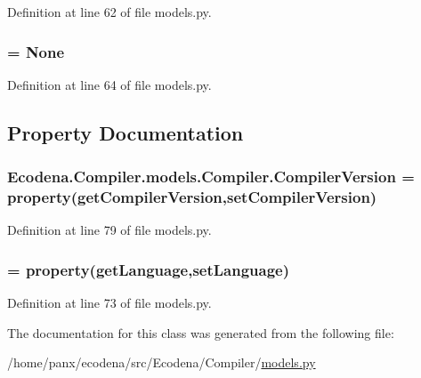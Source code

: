 Definition at line 62 of file models.py.

\hypertarget{class_ecodena_1_1_compiler_1_1models_1_1_compiler_ae14bb831a09036b817bcd4130c2d5374}{
\subsubsection[{question}]{ = None}}
\label{d1/d44/class_ecodena_1_1_compiler_1_1models_1_1_compiler_ae14bb831a09036b817bcd4130c2d5374}


Definition at line 64 of file models.py.



\subsection{Property Documentation}
\hypertarget{class_ecodena_1_1_compiler_1_1models_1_1_compiler_af9f7faa093cfc8b501d201661cefabeb}{
\subsubsection[{CompilerVersion}]{\setlength{\rightskip}{0pt plus 5cm}Ecodena.Compiler.models.Compiler.CompilerVersion = property(getCompilerVersion,setCompilerVersion)}}
\label{d1/d44/class_ecodena_1_1_compiler_1_1models_1_1_compiler_af9f7faa093cfc8b501d201661cefabeb}


Definition at line 79 of file models.py.

\hypertarget{class_ecodena_1_1_compiler_1_1models_1_1_compiler_af0df2c485e0650c50a1cd6e968addfa7}{
\subsubsection[{language}]{ = property(getLanguage,setLanguage)}}
\label{d1/d44/class_ecodena_1_1_compiler_1_1models_1_1_compiler_af0df2c485e0650c50a1cd6e968addfa7}


Definition at line 73 of file models.py.



The documentation for this class was generated from the following file:\begin{DoxyCompactItemize}
\item 
/home/panx/ecodena/src/Ecodena/Compiler/\hyperlink{_compiler_2models_8py}{models.py}\end{DoxyCompactItemize}
